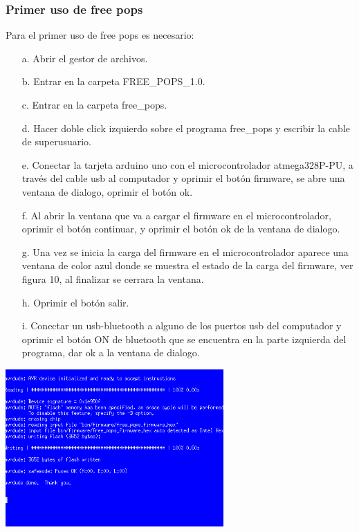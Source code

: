 \documentclass[12pt]{article}
\newenvironment{Figure}
{\par\medskip\noindent\minipage{\linewidth}}
{\endminipage\par\medskip}
\begin{document}
\begin{multicols}{2}
\subsubsection{Primer uso de free pops}
Para el primer uso de free pops es necesario:
\begin{enumerate}
\item[a. ] Abrir el gestor de archivos.
\item[b. ] Entrar en la carpeta FREE\_POPS\_1.0.
\item[c. ] Entrar en la carpeta free\_pops.
\item[d. ] Hacer doble click izquierdo sobre el programa free\_pops y escribir la cable de superusuario.
\item[e. ] Conectar la tarjeta arduino uno con el microcontrolador atmega328P-PU, a través del cable usb al computador y oprimir el botón firmware, se abre una ventana de dialogo, oprimir el botón ok. 
\item[f. ] Al abrir la ventana que va a cargar el firmware en el microcontrolador, oprimir el botón continuar, y oprimir el botón ok de la  ventana de dialogo.
\item[g. ] Una vez se inicia la carga del firmware en el microcontrolador aparece una ventana de color azul donde se muestra el estado de la carga del firmware, ver figura 10, al finalizar se cerrara la ventana.
\item[h. ] Oprimir el botón salir.
\item[i. ] Conectar un usb-bluetooth a alguno de los puertos usb del computador y oprimir el botón ON de bluetooth que se encuentra en la parte izquierda del programa, dar ok a la ventana de dialogo.
\end{enumerate}

\begin{Figure}
\center
\includegraphics[width=8.cm, height=6cm]{fig/micro.png}
\label{fig:10}
\end{Figure}
\vspace{0.2cm}
  

\end{multicols}
\end{document}
